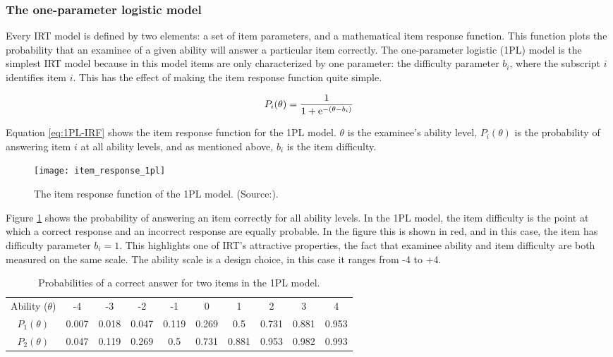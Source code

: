 \subsubsection{The one-parameter logistic model}
Every IRT model is defined by two elements: a set of item parameters, and a mathematical item response function. This function plots the probability that an examinee of a given ability will answer a particular item correctly. The one-parameter logistic (1PL) model is the simplest IRT model because in this model items are only characterized by one parameter: the difficulty parameter $b_i$, where the subscript $i$ identifies item $i$. This has the effect of making the item response function quite simple.

\begin{equation} \label{eq:1PL-IRF}
P_i(\theta) = \dfrac{1}{1 + \mathrm{e}^{-(\theta - b_i)}}
\end{equation}

Equation \eqref{eq:1PL-IRF} shows the item response function for the 1PL model. $\theta$ is the examinee's ability level, $P_i(\theta)$ is the probability of answering item $i$ at all ability levels, and as mentioned above, $b_i$ is the item difficulty.

\begin{figure}[H]
\centering
\texttt{[image: item\_response\_1pl]}
\caption{The item response function of the 1PL model. (Source:\cite{Visual-IRT}).}
\label{fig:item_response_1pl}
\end{figure}

Figure \ref{fig:item_response_1pl} shows the probability of answering an item correctly for all ability levels. In the 1PL model, the item difficulty is the point at which a correct response and an incorrect response are equally probable. In the figure this is shown in red, and in this case, the item has difficulty parameter $b_i=1$. This highlights one of IRT's attractive properties, the fact that examinee ability and item difficulty are both measured on the same scale. The ability scale is a design choice, in this case it ranges from -4 to +4.

\begin{table}[ht] 
\centering
\begin{tabular}{c c c c c c c c c c}
\hline
Ability ($\theta$) & -4 & -3 & -2 & -1 & 0 & 1 & 2 & 3 & 4 \\
$P_1(\theta)$ & 0.007 & 0.018 & 0.047 & 0.119 & 0.269 & 0.5 & 0.731 & 0.881 & 0.953 \\
$P_2(\theta)$ & 0.047 & 0.119 & 0.269 & 0.5 & 0.731 & 0.881 & 0.953 & 0.982 & 0.993  \\
\hline
\end{tabular} 
\caption{Probabilities of a correct answer for two items in the 1PL model.}
\label{table:1PL_table}
\end{table}

